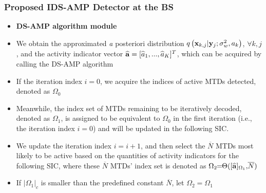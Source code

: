 \documentclass[9pt]{beamer}
\let \it = \textit
\begin{document}
\begin{frame}
\frametitle{Proposed IDS-AMP Detector at the BS}
\begin{itemize}
\item
{\bf DS-AMP algorithm module}
\item
We obtain the approximated {\it a posteriori} distribution $q\left({{\bf x}_{k,j}|{\bf y}_j;\sigma_w^2,a_k}\right)$, $\forall k,j$, and the activity indicator vector $\widehat{\bf a}=[\widehat{a}_1,...,\widehat{a}_K]^T$, which can be acquired by calling the DS-AMP algorithm
\item
If the iteration index $i=0$, we acquire the indices of active MTDs detected, denoted as $\Omega_0$
\item
Meanwhile, the index set of MTDs remaining to be iteratively decoded, denoted as $\Omega_1$, is assigned to be equivalent to $\Omega_0$ in the first iteration (i.e., the iteration index $i=0$) and will be updated in the following SIC.
\item
We update the iteration index $i=i+1$, and then select the $\overline{N}$ MTDs most likely to be active based on the quantities of activity indicators for the following SIC, where these $\overline{N}$ MTDs' index set is denoted as $\Omega_2\!\!=\!\!\Theta([\widehat{\bf a}]_{\Omega_1},\!\overline{N})$ 
\item
If $\left|{\Omega_1}\right|_c$ is smaller than the predefined constant $\overline{N}$, let $\Omega_2=\Omega_1$
\end{itemize}
\end{frame}
\end{document}
